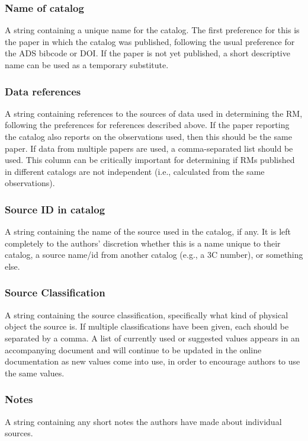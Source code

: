 \documentclass[10pt,modern]{aastex63}
\begin{document}
\subsubsection{Name of catalog}
A string containing a unique name for the catalog. The first preference for this is the paper in which the catalog was published, following the usual preference for the ADS bibcode or DOI. If the paper is not yet published, a short descriptive name can be used as a temporary substitute.

\subsubsection{Data references}
A string containing references to the sources of data used in determining the RM, following the preferences for references described above. If the paper reporting the catalog also reports on the observations used, then this should be the same paper. If data from multiple papers are used, a comma-separated list should be used. This column can be critically important for determining if RMs published in different catalogs are not independent (i.e., calculated from the same observations).

\subsubsection{Source ID in catalog}
A string containing the name of the source used in the catalog, if any. It is left completely to the authors' discretion whether this is a name unique to their catalog, a source name/id from another catalog (e.g., a 3C number), or something else.

\subsubsection{Source Classification}
A string containing the source classification, specifically what kind of physical object the source is. If multiple classifications have been given, each should be separated by a comma. A list of currently used or suggested values appears in an accompanying document and will continue to be updated in the online documentation as new values come into use, in order to encourage authors to use the same values.

\subsubsection{Notes}
A string containing any short notes the authors have made about individual sources.
\end{document}
